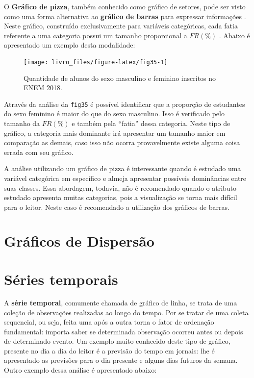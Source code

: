 \documentclass[
]{book}
\begin{document}
O \textbf{Gráfico de pizza}, também conhecido como gráfico de setores, pode ser visto como uma forma alternativa ao \textbf{gráfico de barras} para expressar informações . Neste gráfico, construído exclusivamente para variáveis categóricas, cada fatia referente a uma categoria possui um tamanho proporcional a \(FR(\%)\) . Abaixo é apresentado um exemplo desta modalidade:

\begin{figure}

{\centering \texttt{[image: livro\_files/figure-latex/fig35-1]} 

}

\caption{Quantidade de alunos do sexo masculino e feminino inscritos no ENEM 2018.}\label{fig:fig35}
\end{figure}

Através da análise da \texttt{fig35} é possível identificar que a proporção de estudantes do sexo feminino é maior do que do sexo masculino. Isso é verificado pelo tamanho da \(FR(\%)\) e também pela ``fatia'' dessa categoria. Neste tipo de gráfico, a categoria mais dominante irá apresentar um tamanho maior em comparação as demais, caso isso não ocorra provavelmente existe alguma coisa errada com seu gráfico.

A análise utilizando um gráfico de pizza é interessante quando é estudado uma variável categórica em específico e almeja apresentar possíveis dominâncias entre suas classes. Essa abordagem, todavia, não é recomendado quando o atributo estudado apresenta muitas categorias, pois a visualização se torna mais difícil para o leitor. Neste caso é recomendado a utilização dos gráficos de barras.

\hypertarget{gruxe1ficos-de-dispersuxe3o}{%
\section{Gráficos de Dispersão}\label{gruxe1ficos-de-dispersuxe3o}}

\hypertarget{suxe9ries-temporais}{%
\section{Séries temporais}\label{suxe9ries-temporais}}

A \textbf{série temporal}, comumente chamada de gráfico de linha, se trata de uma coleção de observações realizadas ao longo do tempo. Por se tratar de uma coleta sequencial, ou seja, feita uma após a outra torna o fator de ordenação fundamental: importa saber se determinada observação ocorreu antes ou depois de determinado evento. Um exemplo muito conhecido deste tipo de gráfico, presente no dia a dia do leitor é a previsão do tempo em jornais: lhe é apresentado as previsões para o dia presente e alguns dias futuros da semana. Outro exemplo dessa análise é apresentado abaixo:
\end{document}
